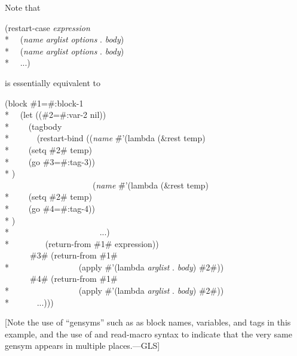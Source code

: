 \begin{defmac}
Note that 
\begin{lisp}
(restart-case {\it expression} \\*
~~({\it name} {\it arglist} {\it options} . {\it body}) \\*
~~({\it name} {\it arglist} {\it options} . {\it body}) \\*
~~...)
\end{lisp}
is essentially equivalent to
\begin{lisp}
(block \#1=\#:block-1 \\*
~~(let ((\#2=\#:var-2 nil)) \\*
~~~~(tagbody \\*
~~~~~~(restart-bind (({\it name} \pushtabs\=\#'(lambda (\&rest temp) \\*
\>~~~~(setq \#2\# temp) \\*
\>~~~~(go \#3=\#:tag-3)) \\*
)\poptabs \\
~~~~~~~~~~~~~~~~~~~~~({\it name} \pushtabs\=\#'(lambda (\&rest temp) \\*
\>~~~~(setq \#2\# temp) \\*
\>~~~~(go \#4=\#:tag-4)) \\*
)\poptabs \\*
~~~~~~~~~~~~~~~~~~~~~...) \\*
~~~~~~~~(return-from \#1\# expression)) \\
~~~~~~\#3\# (return-from \#1\# \\*
~~~~~~~~~~~~~~~~(apply \#'(lambda {\it arglist} . {\it body}) \#2\#)) \\
~~~~~~\#4\# (return-from \#1\# \\*
~~~~~~~~~~~~~~~~(apply \#'(lambda {\it arglist} . {\it body}) \#2\#)) \\*
~~~~~~...)))
\end{lisp}
[Note the use of ``gensyms'' such as  as block names,
variables, and  tags in this example,
and the use of  and  read-macro syntax
to indicate that the very same gensym appears in multiple places.---GLS]



\end{defmac}
